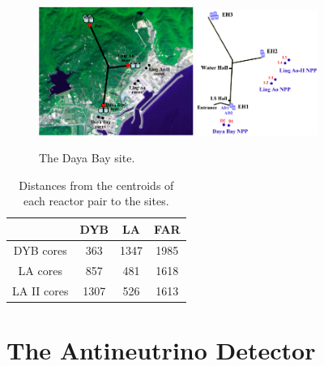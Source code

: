 \begin{figure}
	\centering
	\includegraphics[width=0.45\textwidth]{figures/chap2/dayabay_site.eps}
	\includegraphics[width=0.35\textwidth]{figures/chap2/dayabay_site_illustration.eps}
	\caption{The Daya Bay site.}
	\label{fig:dybsite}
\end{figure}

\begin{table}
	\centering
	\begin{tabular}{|c|c|c|c|}
	\hline
	& DYB & LA & FAR \\
	\hline
	DYB cores & 363 & 1347 & 1985 \\
	\hline
	LA cores & 857 & 481 & 1618 \\
	\hline
	LA II cores & 1307 & 526 & 1613 \\
	\hline
	\end{tabular}
	\caption{Distances from the centroids of each reactor pair to the sites.}
	\label{tab:sitecoredist}
\end{table}


\section{The Antineutrino Detector}

